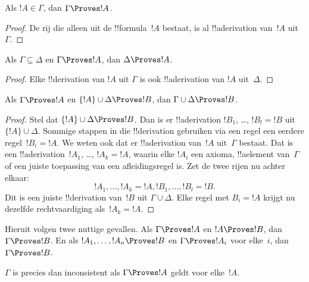 \documentclass[openany]{memoir}
\begin{document}
\begin{prop}
Als $!A \in \Gamma$, dan $\Gamma \Proves !A$.
\end{prop}

\begin{proof}
  De rij die alleen uit de !!{formula}~$!A$ bestaat, is al
  !!a{derivation} van~$!A$ uit~$\Gamma$.
\end{proof}

\begin{prop}
Als $\Gamma \subseteq \Delta$ en $\Gamma \Proves !A$, dan $\Delta
\Proves !A$.
\end{prop}

\begin{proof}
Elke !!{derivation} van $!A$ uit $\Gamma$ is ook !!a{derivation} van
$!A$ uit~$\Delta$.
\end{proof}

\begin{prop}
Als $\Gamma \Proves !A$ en $\{!A\} \cup \Delta \Proves
!B$, dan $\Gamma \cup \Delta \Proves !B$.
\end{prop}

\begin{proof}
  Stel dat $\{!A\} \cup \Delta \Proves !B$. Dan is er
  !!a{derivation} $!B_1$, \dots, $!B_l = !B$ uit~$\{!A\} \cup
  \Delta$. Sommige stappen in die !!{derivation} gebruiken via een
  regel een eerdere regel~$!B_i = !A$. We weten ook dat er
  !!a{derivation} van~$!A$ uit~$\Gamma$ bestaat. Dat is een
  !!a{derivation}~$!A_1$, \dots, $!A_k = !A$, waarin elke $!A_i$ een
  axioma, !!a{element} van~$\Gamma$ of een juiste toepassing van een
  afleidingsregel is. Zet de twee rijen nu achter elkaar:
  \[
  !A_1, \dots, !A_k = !A, !B_1, \dots, !B_l = !B.
  \]
  Dit is een juiste !!{derivation} van~$!B$ uit $\Gamma \cup
  \Delta$. Elke regel met $B_i = !A$ krijgt nu dezelfde
  rechtvaardiging als~$!A_k = !A$.
\end{proof}

Hieruit volgen twee nuttige gevallen. Als $\Gamma \Proves !A$ en $!A
\Proves !B$, dan $\Gamma \Proves !B$. En als $!A_1,
\dots, !A_n \Proves !B$ en $\Gamma \Proves !A_i$ voor elke~$i$, dan
$\Gamma \Proves !B$.

\begin{prop}
$\Gamma$ is precies dan inconsistent als $\Gamma \Proves !A$ geldt
voor elke~$!A$.
\end{prop}
\end{document}
